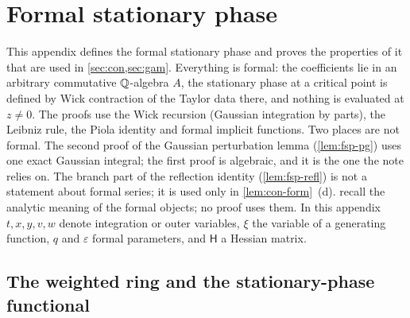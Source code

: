 \section{Formal stationary phase}
\label{sec:fsp}

This appendix defines the formal stationary phase and proves the properties of it that are used in \cref{sec:con,sec:gam}. Everything is formal: the coefficients lie in an arbitrary commutative $\mathbb{Q}$-algebra $A$, the stationary phase at a critical point is defined by Wick contraction of the Taylor data there, and nothing is evaluated at $z\neq0$. The proofs use the Wick recursion (Gaussian integration by parts), the Leibniz rule, the Piola identity and formal implicit functions. Two places are not formal. The second proof of the Gaussian perturbation lemma (\cref{lem:fsp-pg}) uses one exact Gaussian integral; the first proof is algebraic, and it is the one the note relies on. The branch part of the reflection identity (\cref{lem:fsp-refl}) is not a statement about formal series; it is used only in \cref{lem:con-form}~(d).  recall the analytic meaning of the formal objects; no proof uses them. In this appendix $t,x,y,v,w$ denote integration or outer variables, $\xi$ the variable of a generating function, $q$ and $\varepsilon$ formal parameters, and $\mathsf H$ a Hessian matrix.

\subsection{The weighted ring and the stationary-phase functional}
\label{sec:fsp-def}

